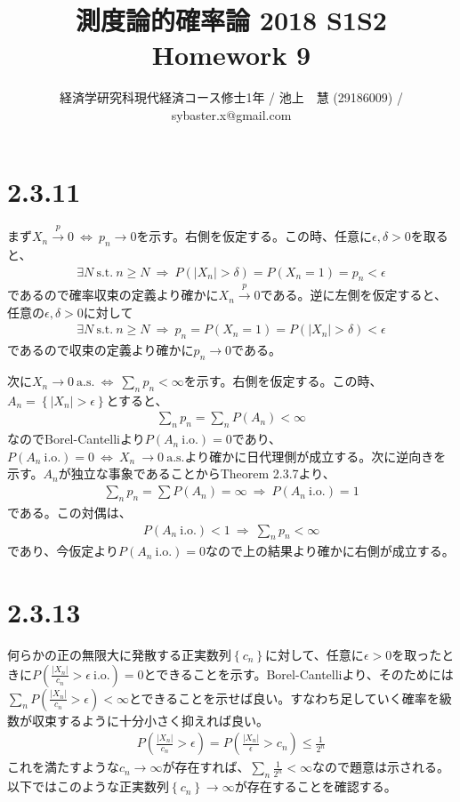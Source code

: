 \documentclass{article}
\begin{document}
\title{測度論的確率論 2018 S1S2 \\ 
Homework 9}
\author{経済学研究科現代経済コース修士1年 / 池上　慧 (29186009) / sybaster.x@gmail.com}
\maketitle

\section{2.3.11}
まず$X_n \xrightarrow{p} 0\ \Leftrightarrow\ p_n \to 0$を示す。右側を仮定する。この時、任意に$\epsilon, \delta > 0$を取ると、
\begin{align*}
	\exists N\ \text{s.t.}\ n\geq N\ \Rightarrow\ P\left( |X_n| > \delta \right) = P(X_n = 1) = p_n < \epsilon
\end{align*}
であるので確率収束の定義より確かに$X_n \xrightarrow{p} 0$である。逆に左側を仮定すると、任意の$\epsilon, \delta > 0$に対して
\begin{align*}
	\exists N\ \text{s.t.}\ n\geq N\ \Rightarrow\ p_n = P(X_n = 1) = P(|X_n| > \delta) < \epsilon
\end{align*}
であるので収束の定義より確かに$p_n \to 0$である。

次に$X_n \to 0\ \text{a.s.}\ \Leftrightarrow\ \sum_n p_n < \infty$を示す。右側を仮定する。この時、$A_n = \left\{ |X_n| > \epsilon \right\}$とすると、
\begin{align*}
	\sum_n p_n = \sum_n P(A_n) < \infty
\end{align*}
なのでBorel-Cantelliより$P(A_n\ \text{i.o.}) = 0$であり、$P(A_n\ \text{i.o.}) = 0\ \Leftrightarrow\ X_n\ \to 0 \ \text{a.s.}$より確かに日代理側が成立する。次に逆向きを示す。$A_n$が独立な事象であることからTheorem 2.3.7より、
\begin{align*}
	\sum_n p_n = \sum P(A_n) = \infty\ \Rightarrow\ P(A_n\ \text{i.o.}) = 1
\end{align*}
である。この対偶は、
\begin{align*}
	P(A_n\ \text{i.o.}) < 1\ \Rightarrow\ \sum_n p_n < \infty
\end{align*}
であり、今仮定より$P(A_n\ \text{i.o.}) = 0$なので上の結果より確かに右側が成立する。

\section{2.3.13}
何らかの正の無限大に発散する正実数列$\left\{ c_n \right\}$に対して、任意に$\epsilon > 0$を取ったときに$P\left( \frac{|X_n|}{c_n} > \epsilon\ \text{i.o.} \right) = 0$とできることを示す。Borel-Cantelliより、そのためには$\sum_n P\left( \frac{|X_n|}{c_n} > \epsilon \right) < \infty$とできることを示せば良い。すなわち足していく確率を級数が収束するように十分小さく抑えれば良い。
\begin{align}
	P\left( \frac{|X_n|}{c_n} > \epsilon \right) = P\left( \frac{|X_n|}{\epsilon} > c_n \right) \leq \frac{1}{2^n}
\end{align}
これを満たすような$c_n\to \infty$が存在すれば、$\sum_n \frac{1}{2^n} < \infty$なので題意は示される。以下ではこのような正実数列$\left\{ c_n \right\}\to \infty$が存在することを確認する。
\end{document}
